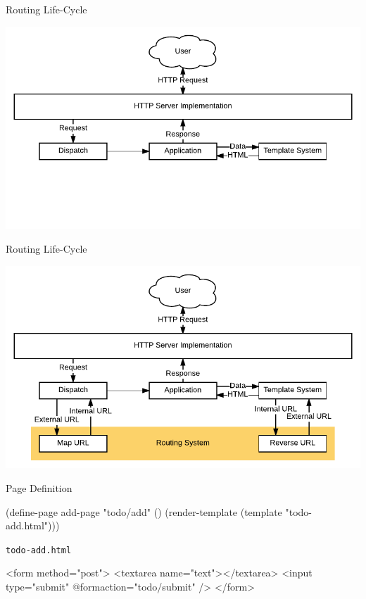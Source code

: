 \documentclass[14pt]{beamer}
\def\code#1{{\color{codecolor}\texttt{#1}}}
\renewcommand{\title}[1]{
  {\huge #1} \vskip 0.4cm
}
\begin{document}
\begin{frame}
  \title{Routing Life-Cycle}
  \includegraphics[width=\columnwidth]{request-simple}
\end{frame}

\begin{frame}
  \title{Routing Life-Cycle}
  \includegraphics[width=\columnwidth]{request}
\end{frame}

\begin{frame}[fragile]
  \title{Page Definition}
\begin{lispcode}
(define-page add-page "todo/add" ()
  (render-template (template "todo-add.html")))
\end{lispcode}
  \pause
  \vskip 1cm
  {\footnotesize\code{todo-add.html}}
\begin{htmlcode}
<form method="post">
  <textarea name="text"></textarea>
  <input type="submit" @formaction="todo/submit" />
</form>
\end{htmlcode}
\end{frame}
\end{document}
